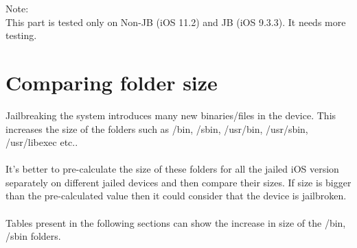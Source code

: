 Note:\\ 
This part is tested only on Non-JB (iOS 11.2) and JB (iOS 9.3.3). It needs more testing.


\newpage
\section{Comparing folder size}
\vspace{20px}

Jailbreaking the system introduces many new binaries/files in the device. This increases the size of the folders such as /bin, /sbin, /usr/bin, /usr/sbin, /usr/libexec etc..\\\\
It's better to pre-calculate the size of these folders for all the jailed iOS version separately on different jailed devices and then compare their sizes. If size is bigger than the pre-calculated value then it could consider that the device is jailbroken.\\\\
Tables present in the following sections can show the increase in size of the /bin, /sbin folders.

\newpage
